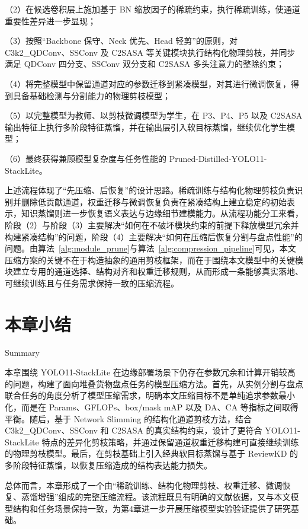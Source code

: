 \par\noindent
（2）在候选卷积层上施加基于 BN 缩放因子的稀疏约束，执行稀疏训练，使通道重要性差异进一步显现；

\par\noindent
（3）按照“Backbone 保守、Neck 优先、Head 轻剪”的原则，对 C3k2\_QDConv、SSConv 及 C2SASA 等关键模块执行结构化物理剪枝，并同步满足 QDConv 四分支、SSConv 双分支和 C2SASA 多头注意力的整除约束；

\par\noindent
（4）将完整模型中保留通道对应的参数迁移到紧凑模型，对其进行微调恢复，得到具备基础检测与分割能力的物理剪枝模型；

\par\noindent
（5）以完整模型为教师、以剪枝微调模型为学生，在 P3、P4、P5 以及 C2SASA 输出特征上执行多阶段特征蒸馏，并在输出层引入软目标蒸馏，继续优化学生模型；

\par\noindent
（6）最终获得兼顾模型复杂度与任务性能的 Pruned-Distilled-YOLO11-StackLite。

上述流程体现了“先压缩、后恢复”的设计思路。稀疏训练与结构化物理剪枝负责识别并删除低贡献通道，权重迁移与微调恢复负责在紧凑结构上建立稳定的初始表示，知识蒸馏则进一步恢复语义表达与边缘细节建模能力。从流程功能分工来看，阶段（2）与阶段（3）主要解决“如何在不破坏模块约束的前提下释放模型冗余并构建紧凑结构”的问题，阶段（4）主要解决“如何在压缩后恢复分割与盘点性能”的问题。由算法~\ref{alg:module_prune}与算法~\ref{alg:compression_pipeline}可见，本文压缩方案的关键不在于构造抽象的通用剪枝框架，而在于围绕本文模型中的关键模块建立专用的通道选择、结构对齐和权重迁移规则，从而形成一条能够真实落地、可继续训练且与任务需求保持一致的压缩流程。

\section{本章小结}{Summary}

本章围绕 YOLO11-StackLite 在边缘部署场景下仍存在参数冗余和计算开销较高的问题，构建了面向堆叠货物盘点任务的模型压缩方法。首先，从实例分割与盘点联合任务的角度分析了模型压缩需求，明确本文压缩目标不是单纯追求参数最小化，而是在 Params、GFLOPs、box/mask mAP 以及 DA、CA 等指标之间取得平衡。随后，基于 Network Slimming 的结构化通道剪枝方法，结合 C3k2\_QDConv、SSConv 和 C2SASA 的真实结构约束，设计了更符合 YOLO11-StackLite 特点的差异化剪枝策略，并通过保留通道权重迁移构建可直接继续训练的物理剪枝模型。最后，在剪枝基础上引入经典软目标蒸馏与基于 ReviewKD 的多阶段特征蒸馏，以恢复压缩造成的结构表达能力损失。

总体而言，本章形成了一个由“稀疏训练、结构化物理剪枝、权重迁移、微调恢复、蒸馏增强”组成的完整压缩流程。该流程既具有明确的文献依据，又与本文模型结构和任务场景保持一致，为第4章进一步开展压缩模型实验验证提供了研究基础。
